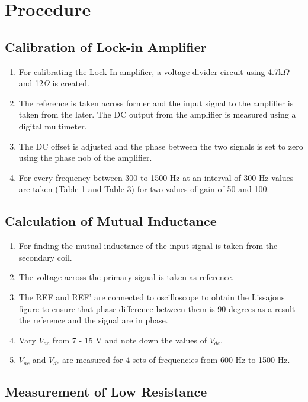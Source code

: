 \section{Procedure}

\subsection{Calibration of Lock-in Amplifier}

\begin{enumerate}
    \item For calibrating the Lock-In amplifier, a voltage
    divider circuit using 4.7k$\Omega$ and 12$\Omega$ is created.
    \item The reference is taken across former and the
    input signal to the amplifier is taken from the
    later. The DC output from the amplifier is measured using a digital multimeter.
    \item The DC offset
    is adjusted and the phase between the two signals is set to zero using the phase nob of the
    amplifier.
    \item For every frequency between 300 to
    1500 Hz at an interval of 300 Hz values are taken
    (Table 1 and Table 3) for two values of gain of 50 and 100.
\end{enumerate}

\subsection{Calculation of Mutual Inductance}
\begin{enumerate}
    \item For finding the mutual inductance of the input
    signal is taken from the secondary coil.
    \item The
    voltage across the primary signal is taken as
    reference.
    \item The REF and REF’ are connected
    to oscilloscope to obtain the Lissajous figure to
    ensure that phase difference between them is 90
    degrees as a result the reference and the signal
    are in phase.
    \item Vary $V_{ac}$ from 7 - 15 V and note down the values of $V_{dc}$.
    \item $V_{ac}$ and $V_{dc}$ are measured for 4 sets of frequencies from 600 Hz to 1500 Hz.
\end{enumerate}

\subsection{Measurement of Low Resistance}

